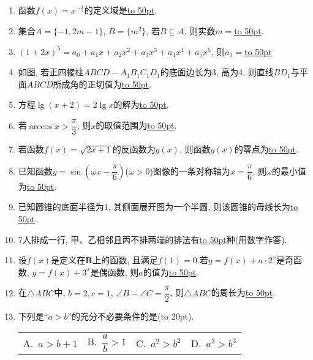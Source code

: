 \documentclass[10pt,a4paper]{article}
\newcommand{\blank}[1]{\underline{\hbox to #1pt{}}}
\newcommand{\bracket}[1]{(\hbox to #1pt{})}
\newcommand{\fourch}[4]{\par\begin{tabular}{p{.23\textwidth}p{.23\textwidth}p{.23\textwidth}p{.23\textwidth}}
A.~#1 &B.~#2& C.~#3& D.~#4
\end{tabular}}
\begin{document}
\begin{enumerate}[1.]

\item 函数$f(x)={x^{-\frac 12}}$的定义域是\blank{50}.
\item 集合$A=\{-1, 2m-1\}$, $B=\{m^2\}$, 若$B\subseteq A$, 则实数$m=$\blank{50}.
\item $(1+2x)^5=a_0+a_1x+a_2x^2+a_3x^3+a_4x^4+a_5x^5$, 则$a_3=$\blank{50}
\item 如图, 若正四棱柱$ABCD-A_1B_1C_1D_1$的底面边长为$3$, 高为$4$, 则直线$BD_1$与平面$ABCD$所成角的正切值为\blank{50}.
\begin{center}
\end{center}
\item 方程$\lg (x+2)=2\lg x$的解为\blank{50}.
\item 若$\arccos x>\dfrac{\pi}3$, 则$x$的取值范围为\blank{50}.
\item 若函数$f(x)=\sqrt{2x+1}$的反函数为$g(x)$, 则函数$g(x)$的零点为\blank{50}.
\item 已知函数$y=\sin (\omega x-\dfrac{\pi}6)$($\omega >0$)图像的一条对称轴为$x=\dfrac{\pi}6$, 则$\omega$的最小值为\blank{50}.
\item 已知圆锥的底面半径为$1$, 其侧面展开图为一个半圆, 则该圆锥的母线长为\blank{50}.
\item $7$人排成一行, 甲、乙相邻且丙不排两端的排法有\blank{50}种(用数字作答).
\item 设$f(x)$是定义在$\mathbf{R}$上的函数, 且满足$f(1)=0$.若$y=f(x)+a\cdot 2^x$是奇函数, $y=f(x)+3^x$是偶函数, 则$a$的值为\blank{50}.
\item 在$\triangle ABC$中, $b=2,c=1$, $\angle B-\angle C=\dfrac{\pi}2$, 则$\triangle ABC$的周长为\blank{50}.
\item 下列是``$a>b$''的充分不必要条件的是\bracket{20}.
\fourch{$a>b+1$}{$\dfrac ab>1$}{$a^2>b^2$}{$a^3>b^3$}

\end{enumerate}
\end{document}
